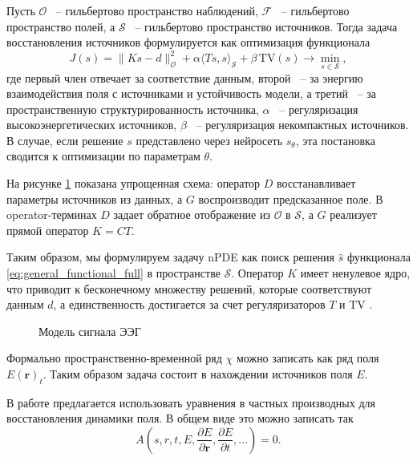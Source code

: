\documentclass[a4paper,14pt,oneside,openany]{extarticle}
\begin{document}
Пусть $\mathcal{O}$ ~-- гильбертово пространство наблюдений, $\mathcal{F}$ 
~-- гильбертово пространство полей, а $\mathcal{S}$ ~-- гильбертово 
пространство источников. Тогда задача восстановления источников 
формулируется как оптимизация функционала
\begin{equation}\label{eq:general_functional_full}
    J(s) = \|K s - d\|_{\mathcal{O}}^2 + \alpha \langle T s, s \rangle_{\mathcal{S}} + 
    \beta\,\mathrm{TV}(s) \rightarrow \min_{s\in\mathcal{S}},
\end{equation}
где первый член отвечает за соответствие данным, второй ~-- за энергию взаимодействия поля 
с источниками и устойчивость модели, а третий ~-- за пространственную структурированность 
источника, $\alpha$ ~-- регуляризация высокоэнергетических источников, 
$\beta$ ~-- регуляризация некомпактных источников. В случае, если решение $s$ 
представлено через нейросеть $s_\theta$, эта постановка сводится к оптимизации 
по параметрам $\theta$.

На рисунке \ref{fig: LNN} показана упрощенная схема: оператор $D$ восстанавливает параметры источников из данных, 
а $G$ воспроизводит предсказанное поле. В operator-терминах $D$ задает обратное отображение из $\mathcal{O}$ в $\mathcal{S}$,
а $G$ реализует прямой оператор $K = C T$.

Таким образом, мы формулируем задачу nPDE как поиск решения $\hat{s}$ функционала 
\eqref{eq:general_functional_full} в пространстве $\mathcal{S}$. Оператор $K$ имеет ненулевое ядро, 
что приводит к бесконечному множеству решений, которые соответствуют данным $d$, 
а единственность достигается за счет регуляризаторов $T$ и $\mathrm{TV}$ \cite{Morik2024}.

\begin{figure}[H]
\centerline{
}
\caption{Модель сигнала ЭЭГ}
\label{fig: LNN}
\end{figure}

Формально пространственно-временной ряд $\chi$ можно записать как ряд поля $E(\mathbf{r})_t$. 
Таким образом задача состоит в нахождении источников поля $E$. 

В работе предлагается использовать уравнения в частных производных для восстановления динамики поля. 
В общем виде это можно записать так
$$A\left(s, r, t, E, \frac{\partial E}{\partial\mathbf{r}}, \frac{\partial E}{\partial t}, \dots \right) = 0.$$ 
\end{document}
